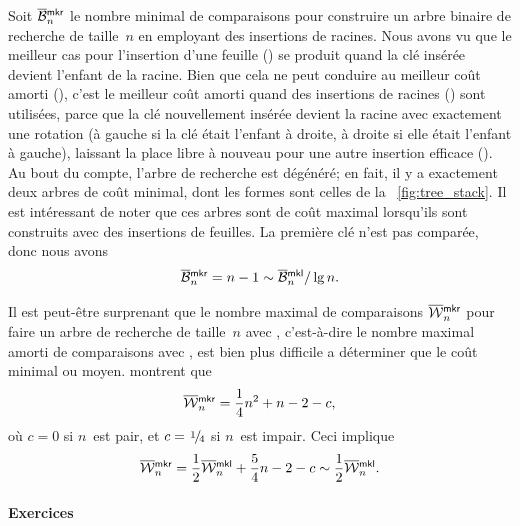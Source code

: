 Soit \(\OB{\fun{mkr}}{n}\) le nombre
minimal de comparaisons pour construire un arbre binaire de recherche
de taille~\(n\) en employant des insertions de racines. Nous avons vu
que le meilleur cas pour l'insertion d'une feuille () se
produit quand la clé insérée devient l'enfant de la racine. Bien que
cela ne peut conduire au meilleur coût amorti (), c'est le
meilleur coût amorti quand des insertions de racines ()
sont utilisées, parce que la clé nouvellement insérée devient la
racine avec exactement une rotation (à gauche si la clé était l'enfant
à droite, à droite si elle était l'enfant à gauche), laissant la place
libre à nouveau pour une autre insertion efficace (). Au
bout du compte, l'arbre de recherche est dégénéré; en fait, il y a
exactement deux arbres de coût minimal, dont les formes sont celles de
la \fig~\vref{fig:tree_stack}. Il est intéressant de noter que ces
arbres sont de coût maximal lorsqu'ils sont construits avec des
insertions de feuilles. La première clé n'est pas comparée, donc nous
avons
\begin{equation*}
  \OB{\fun{mkr}}{n} = n - 1 \sim \OB{\fun{mkl}}{n}/\lg n.
\end{equation*}

Il est peut-être surprenant que le nombre maximal de comparaisons
\(\OW{\fun{mkr}}{n}\) pour faire un
arbre de recherche de taille~\(n\) avec , c'est-à-dire le
nombre maximal amorti de comparaisons avec , est bien plus
difficile a déterminer que le coût minimal ou moyen.
\cite{GeldenhuysVanderMerwe_2009} montrent que
\begin{equation*}
\OW{\fun{mkr}}{n} = \frac{1}{4}n^2 + n - 2 - c,
\end{equation*}
où \(c = 0\) si \(n\)~est pair, et \(c=\myfrac{1}/{4}\) si
\(n\)~est impair. Ceci implique
\begin{equation*}
\OW{\fun{mkr}}{n} = \frac{1}{2}\OW{\fun{mkl}}{n} + \frac{5}{4}n - 2 -
c \sim \frac{1}{2}\OW{\fun{mkl}}{n}.
\end{equation*}

\paragraph{Exercices}

